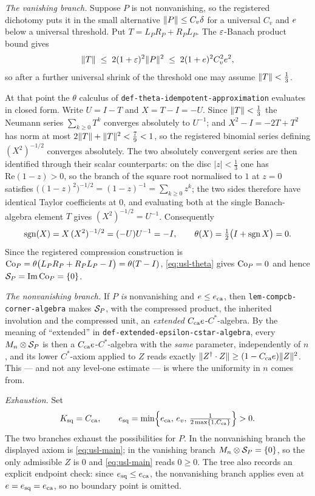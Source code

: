 \emph{The vanishing branch.} Suppose $P$ is not nonvanishing, so the registered dichotomy
puts it in the small alternative $\lVert P\rVert\le C_v\delta$ for a universal $C_v$ and
$e$ below a universal threshold. Put $T=L_PR_P+R_PL_P$. The $\varepsilon$-Banach product
bound gives
\[
  \lVert T\rVert\;\le\;2(1+\varepsilon)^{2}\lVert P\rVert^{2}\;\le\;2(1+e)^{2}C_v^{2}e^{2},
\]
so after a further universal shrink of the threshold one may assume $\lVert T\rVert<\tfrac13$.

At that point the $\theta$ calculus of \texttt{def-theta-idempotent-approximation}
evaluates in closed form. Write $U=I-T$ and $X=T-I=-U$. Since $\lVert T\rVert<\tfrac13$ the
Neumann series $\sum_{k\ge0}T^{k}$ converges absolutely to $U^{-1}$; and
$X^{2}-I=-2T+T^{2}$ has norm at most $2\lVert T\rVert+\lVert T\rVert^{2}<\tfrac79<1$, so the registered
binomial series defining $(X^{2})^{-1/2}$ converges absolutely. The two absolutely
convergent series are then identified through their scalar counterparts: on the disc
$\lvert z\rvert<\tfrac13$ one has $\mathrm{Re}(1-z)>0$, so the branch of the square root
normalised to $1$ at $z=0$ satisfies
$\bigl((1-z)^{2}\bigr)^{-1/2}=(1-z)^{-1}=\sum_{k\ge0}z^{k}$; the two sides therefore have
identical Taylor coefficients at $0$, and evaluating both at the single Banach-algebra
element $T$ gives $(X^{2})^{-1/2}=U^{-1}$. Consequently
\begin{equation}\label{eq:usl-theta}
  \operatorname{sgn}(X)=X\,(X^{2})^{-1/2}=(-U)U^{-1}=-I,
  \qquad
  \theta(X)=\tfrac12\bigl(I+\operatorname{sgn} X\bigr)=0 .
\end{equation}
Since the registered compression construction is
$\mathrm{Co}_{P}=\theta\bigl(L_PR_P+R_PL_P-I\bigr)=\theta(T-I)$, \eqref{eq:usl-theta} gives
$\mathrm{Co}_{P}=0$ and hence $\mathcal S_{P}=\operatorname{Im}\mathrm{Co}_{P}=\{0\}$.

\emph{The nonvanishing branch.} If $P$ \emph{is} nonvanishing and
$e\le e_{\mathrm{ca}}$, then \texttt{lem-compcb-corner-algebra} makes $\mathcal S_{P}$,
with the compressed product, the inherited involution and the compressed unit, an
\emph{extended} $C_{\mathrm{ca}}e$-$C^*$-algebra. By the meaning of ``extended'' in
\texttt{def-extended-epsilon-cstar-algebra}, every $M_{n}\otimes \mathcal S_{P}$ is then a
$C_{\mathrm{ca}}e$-$C^*$-algebra with the \emph{same} parameter, independently of $n$,
and its lower $C^*$-axiom applied to $Z$ reads exactly
$\lVert Z^{\dagger}\mathbin{\cdot} Z\rVert\ge(1-C_{\mathrm{ca}}e)\lVert Z\rVert^{2}$. This --- and not any level-one
estimate --- is where the uniformity in $n$ comes from.

\emph{Exhaustion.} Set
\[
  K_{\mathrm{sq}}=C_{\mathrm{ca}},
  \qquad
  e_{\mathrm{sq}}=\min\Bigl\{e_{\mathrm{ca}},\,e_v,\,\tfrac1{2\max\{1,C_{\mathrm{ca}}\}}\Bigr\}>0 .
\]
The two branches exhaust the possibilities for $P$. In the nonvanishing branch the
displayed axiom is \eqref{eq:usl-main}; in the vanishing branch
$M_{n}\otimes \mathcal S_{P}=\{0\}$, so the only admissible $Z$ is $0$ and \eqref{eq:usl-main} reads
$0\ge0$. The tree also records an explicit endpoint check: since
$e_{\mathrm{sq}}\le e_{\mathrm{ca}}$, the nonvanishing branch applies even at
$e=e_{\mathrm{sq}}=e_{\mathrm{ca}}$, so no boundary point is omitted.


